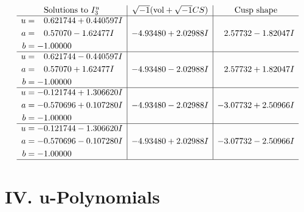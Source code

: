 \documentclass[1p]{elsarticle_modified}
\theoremstyle{definition}
\newcommand{\I}{\sqrt{-1}}
\begin{document}
$$\begin{array}{c|c|c}  
\text{Solutions to }I^u_{3}& \I (\text{vol} + \sqrt{-1}CS) & \text{Cusp shape}\\
 \hline 
\begin{aligned}
u &= \phantom{-}0.621744 + 0.440597 I \\
a &= \phantom{-}0.57070 - 1.62477 I \\
b &= -1.00000\phantom{ +0.000000I}\end{aligned}
 & -4.93480 + 2.02988 I & \phantom{-}2.57732 - 1.82047 I \\ \hline\begin{aligned}
u &= \phantom{-}0.621744 - 0.440597 I \\
a &= \phantom{-}0.57070 + 1.62477 I \\
b &= -1.00000\phantom{ +0.000000I}\end{aligned}
 & -4.93480 - 2.02988 I & \phantom{-}2.57732 + 1.82047 I \\ \hline\begin{aligned}
u &= -0.121744 + 1.306620 I \\
a &= -0.570696 + 0.107280 I \\
b &= -1.00000\phantom{ +0.000000I}\end{aligned}
 & -4.93480 - 2.02988 I & -3.07732 + 2.50966 I \\ \hline\begin{aligned}
u &= -0.121744 - 1.306620 I \\
a &= -0.570696 - 0.107280 I \\
b &= -1.00000\phantom{ +0.000000I}\end{aligned}
 & -4.93480 + 2.02988 I & -3.07732 - 2.50966 I\\
 \hline 
 \end{array}$$\newpage
\newpage\renewcommand{\arraystretch}{1}
\centering \section*{ IV. u-Polynomials}
\end{document}
